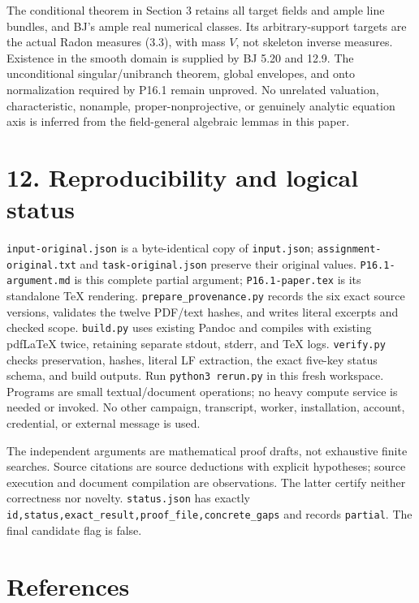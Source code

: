 \documentclass[
  10pt,
]{article}
\begin{document}
The conditional theorem in Section 3 retains all target fields and ample
line bundles, and BJ's ample real numerical classes. Its
arbitrary-support targets are the actual Radon measures (3.3), with mass
\(V\), not skeleton inverse measures. Existence in the smooth domain is
supplied by BJ 5.20 and 12.9. The unconditional singular/unibranch
theorem, global envelopes, and onto normalization required by P16.1
remain unproved. No unrelated valuation, characteristic, nonample,
proper-nonprojective, or genuinely analytic equation axis is inferred
from the field-general algebraic lemmas in this paper.

\section{12. Reproducibility and logical
status}\label{reproducibility-and-logical-status}

\texttt{input-original.json} is a byte-identical copy of
\texttt{input.json}; \texttt{assignment-original.txt} and
\texttt{task-original.json} preserve their original values.
\texttt{P16.1-argument.md} is this complete partial argument;
\texttt{P16.1-paper.tex} is its standalone TeX rendering.
\texttt{prepare\_provenance.py} records the six exact source versions,
validates the twelve PDF/text hashes, and writes literal excerpts and
checked scope. \texttt{build.py} uses existing Pandoc and compiles with
existing pdfLaTeX twice, retaining separate stdout, stderr, and TeX
logs. \texttt{verify.py} checks preservation, hashes, literal LF
extraction, the exact five-key status schema, and build outputs. Run
\texttt{python3\ rerun.py} in this fresh workspace. Programs are small
textual/document operations; no heavy compute service is needed or
invoked. No other campaign, transcript, worker, installation, account,
credential, or external message is used.

The independent arguments are mathematical proof drafts, not exhaustive
finite searches. Source citations are source deductions with explicit
hypotheses; source execution and document compilation are observations.
The latter certify neither correctness nor novelty. \texttt{status.json}
has exactly \texttt{id,status,exact\_result,proof\_file,concrete\_gaps}
and records \texttt{partial}. The final candidate flag is false.

\section{References}\label{references}
\end{document}
